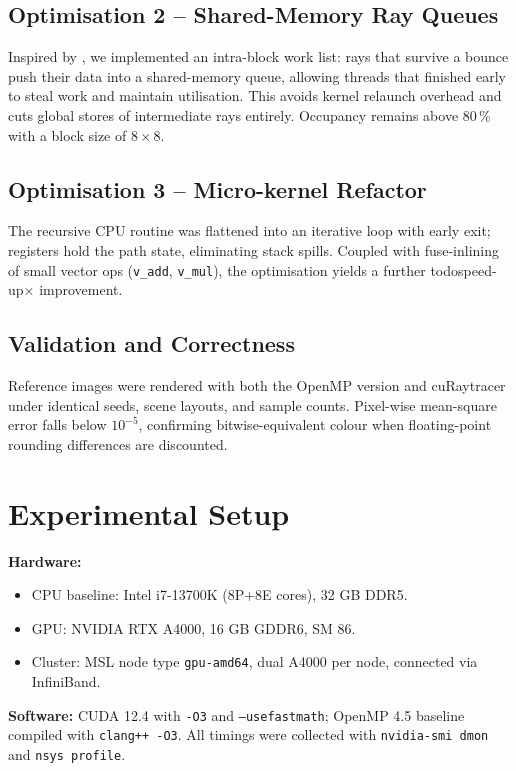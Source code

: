 \subsection{Optimisation 2 – Shared-Memory Ray Queues}
Inspired by \cite{Pitkin2014}, we implemented an intra-block work list:
rays that survive a bounce push their data into a shared-memory queue,
allowing threads that finished early to steal work and maintain
utilisation.  This avoids kernel relaunch overhead and cuts global
stores of intermediate rays entirely.  Occupancy remains above
80\,\% with a block size of $8\times 8$.

\subsection{Optimisation 3 – Micro-kernel Refactor}
The recursive CPU routine was flattened into an iterative loop with
early exit; registers hold the path state, eliminating stack spills.
Coupled with fuse-inlining of small vector ops
(\texttt{v\_add}, \texttt{v\_mul}), the optimisation yields a further
todo{speed-up}× improvement.

\subsection{Validation and Correctness}
Reference images were rendered with both the OpenMP version and
cuRaytracer under identical seeds, scene layouts, and sample counts.
Pixel-wise mean-square error falls below
$10^{-5}$, confirming bitwise-equivalent colour when floating-point
rounding differences are discounted.

\section{Experimental Setup}
\textbf{Hardware:}  
\begin{itemize}
  \item CPU baseline: Intel i7-13700K (8P+8E cores), 32 GB DDR5.
  \item GPU: NVIDIA RTX A4000, 16 GB GDDR6, SM 86.
  \item Cluster: MSL node type \texttt{gpu-amd64}, dual A4000 per node,
        connected via InfiniBand.
\end{itemize}

\noindent\textbf{Software:}
CUDA 12.4 with \texttt{-O3} and
\texttt{--use\-fast\-math}; OpenMP 4.5 baseline compiled with
\texttt{clang++ -O3}.  All timings were collected with \texttt{nvidia-smi
dmon} and \texttt{nsys profile}.

